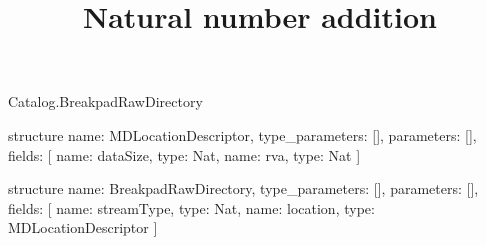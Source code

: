 \begin{lexlean}{Catalog.BreakpadRawDirectory}
\title{Natural number addition}
\begin{semanticmodule}
structure{
  name: MDLocationDescriptor,
  type_parameters: [],
  parameters: [],
  fields: [
    {name: dataSize, type: Nat},
    {name: rva, type: Nat}
  ]
}

structure{
  name: BreakpadRawDirectory,
  type_parameters: [],
  parameters: [],
  fields: [
    {name: streamType, type: Nat},
    {name: location, type: MDLocationDescriptor}
  ]
}
\end{semanticmodule}
\end{lexlean}

